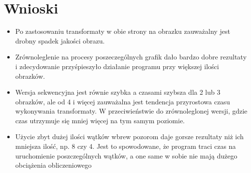 \section{Wnioski}
\begin{itemize}
	\item Po zastosowaniu transformaty w obie strony na obrazku zauważalny jest drobny spadek jakości obrazu.
	\item Zrównoleglenie na procesy poszeczególnych grafik dało bardzo dobre rezultaty i zdecydowanie przyśpieszyło działanie programu przy większej ilości obrazków.
	\item Wersja sekwencyjna jest równie szybka a czasami szybsza dla 2 lub 3 obrazków, ale od 4 i więcej zauważalna jest tendencja przyrostowa czasu wykonywania transformaty. W przeciwieństwie do zrównoleglonej wersji, gdzie czas utrzymuje się mniej więcej na tym samym poziomie.
	\item Użycie zbyt dużej ilości wątków wbrew pozorom daje gorsze rezultaty niż ich mniejsza ilość, np. 8 czy 4. Jest to spowodowane, że program traci czas na uruchomienie poszczególnych wątków, a one same w sobie nie mają dużego obciążenia obliczeniowego
\end{itemize}

